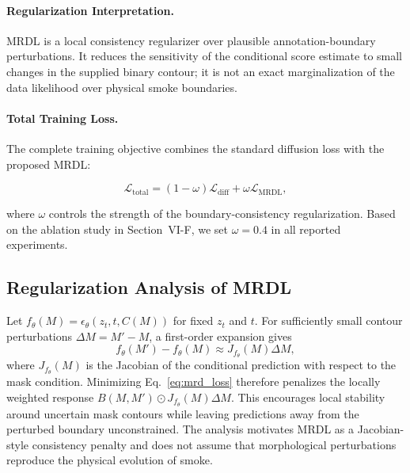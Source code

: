 \documentclass[journal]{IEEEtran}
\begin{document}
\paragraph{Regularization Interpretation.}
MRDL is a local consistency regularizer over plausible annotation-boundary perturbations. It reduces the sensitivity of the conditional score estimate to small changes in the supplied binary contour; it is not an exact marginalization of the data likelihood over physical smoke boundaries.

\paragraph{Total Training Loss.}
The complete training objective combines the standard diffusion loss
with the proposed MRDL:

\begin{equation}
\mathcal{L}_{\mathrm{total}}
=
(1-\omega)\mathcal{L}_{\mathrm{diff}}
+
\omega\mathcal{L}_{\mathrm{MRDL}},
\label{eq:total_loss}
\end{equation}

where $\omega$ controls the strength of the boundary-consistency
regularization. Based on the ablation study in Section~VI-F, we set
$\omega=0.4$ in all reported experiments.







\subsection{Regularization Analysis of MRDL}
\label{sec:theory_mrdl}

Let $f_\theta(M)=\epsilon_\theta(z_t,t,C(M))$ for fixed $z_t$ and $t$. For sufficiently small contour perturbations $\Delta M=M'-M$, a first-order expansion gives
\begin{equation}
f_\theta(M')-f_\theta(M)\approx J_{f_\theta}(M)\Delta M,
\end{equation}
where $J_{f_\theta}(M)$ is the Jacobian of the conditional prediction with respect to the mask condition. Minimizing Eq.~\eqref{eq:mrd_loss} therefore penalizes the locally weighted response $B(M,M')\odot J_{f_\theta}(M)\Delta M$. This encourages local stability around uncertain mask contours while leaving predictions away from the perturbed boundary unconstrained. The analysis motivates MRDL as a Jacobian-style consistency penalty and does not assume that morphological perturbations reproduce the physical evolution of smoke.
\end{document}
